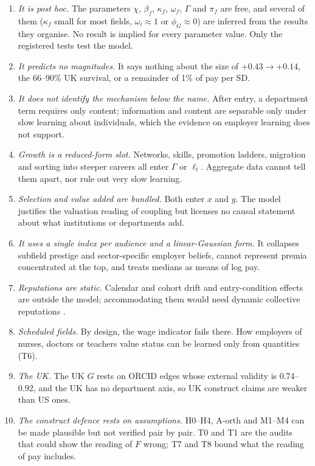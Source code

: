 \begin{enumerate}
\item \emph{It is post hoc.} The parameters $\chi$, $\beta_f$, $\kappa_f$, $\omega_f$, $\Gamma$ and $\pi_f$ are free,
and several of them ($\kappa_f$ small for most fields, $\omega_i\approx1$ or $\phi_G\approx0$) are inferred from the
results they organise. No result is implied for every parameter value. Only the registered tests test the model.
\item \emph{It predicts no magnitudes.} It says nothing about the size of $+0.43\to+0.14$, the 66--90\% UK
survival, or a remainder of 1\% of pay per SD.
\item \emph{It does not identify the mechanism below the name.} After entry, a department term requires only
content; information and content are separable only under slow learning about individuals, which the evidence on
employer learning does not support.
\item \emph{Growth is a reduced-form slot.} Networks, skills, promotion ladders, migration and sorting into steeper
careers all enter $\Gamma$ or $\ell_t$. Aggregate data cannot tell them apart, nor rule out very slow learning.
\item \emph{Selection and value added are bundled.} Both enter $x$ and $y$. The model justifies the valuation
reading of coupling but licenses no causal statement about what institutions or departments add.
\item \emph{It uses a single index per audience and a linear-Gaussian form.} It collapses subfield prestige and
sector-specific employer beliefs, cannot represent premia concentrated at the top, and treats medians as means of
log pay.
\item \emph{Reputations are static.} Calendar and cohort drift and entry-condition effects are outside the model;
accommodating them would need dynamic collective reputations \citep{tirole1996theory}.
\item \emph{Scheduled fields.} By design, the wage indicator fails there. How employers of nurses, doctors or
teachers value status can be learned only from quantities (T6).
\item \emph{The UK.} The UK $G$ rests on ORCID edges whose external validity is 0.74--0.92, and the UK has no
department axis, so UK construct claims are weaker than US ones.
\item \emph{The construct defence rests on assumptions.} H0--H4, A-orth and M1--M4 can be made plausible but not
verified pair by pair. T0 and T1 are the audits that could show the reading of $F$ wrong; T7 and T8 bound what the
reading of pay includes.
\end{enumerate}
